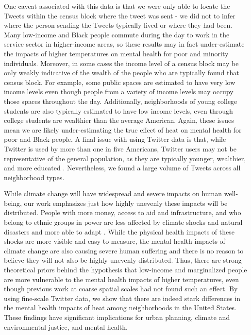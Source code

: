 \documentclass[fleqn,10pt]{wlscirep}
\begin{document}
One caveat associated with this data is that we were only able to locate the Tweets within the census block where the tweet was sent - we did not to infer where the person sending the Tweets typically lived or where they had been.  Many low-income and Black people commute during the day to work in the service sector in higher-income areas, so these results may in fact under-estimate the impacts of higher temperatures on mental health for poor and minority individuals.  Moreover, in some cases the income level of a census block may be only weakly indicative of the wealth of the people who are typically found that census block.  For example, some public spaces are estimated to have very low income levels even though people from a variety of income levels may occupy those spaces throughout the day.  Additionally, neighborhoods of young college students are also typically estimated to have low income levels, even through college students are wealthier than the average American.  Again, these issues mean we are likely under-estimating the true effect of heat on mental health for poor and Black people.  A final issue with using Twitter data is that, while Twitter is used by more than one in five Americans, Twitter users may not be representative of the general population, as they are typically younger, wealthier, and more educated \cite{Pew2020Sep}.  Nevertheless, we found a large volume of Tweets across all neighborhood types.

While climate change will have widespread and severe impacts on human well-being, our work emphasizes just how highly unevenly these impacts will be distributed. People with more money, access to aid and infrastructure, and who belong to ethnic groups in power are less affected by climate shocks and natural disasters and more able to adapt \cite{bullard2012wrong}. While the physical health impacts of these shocks are more visible and easy to measure, the mental health impacts of climate change are also causing severe human suffering and there is no reason to believe they will not also be highly unevenly distributed.  Thus, there are strong theoretical priors behind the hypothesis that low-income and marginalized people are more vulnerable to the mental health impacts of higher temperatures, even though previous work at coarse spatial scales had not found such an effect.  By using fine-scale Twitter data, we show that there are indeed stark differences in the mental health impacts of heat among neighborhoods in the United States.  These findings have significant implications for urban planning, climate and environmental justice, and mental health.
\end{document}
